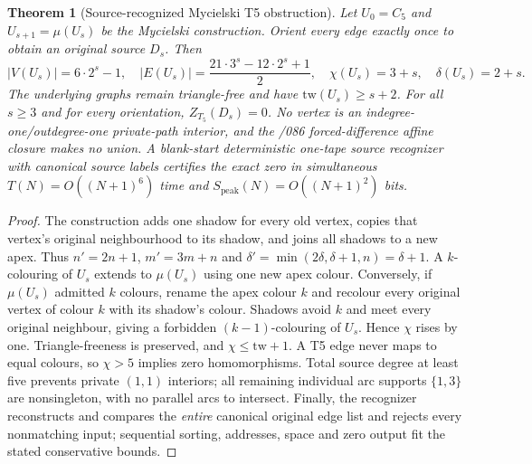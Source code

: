\documentclass[11pt]{article}
\newtheorem{theorem}{Theorem}
\begin{document}
\begin{theorem}[Source-recognized Mycielski T5 obstruction]
Let $U_0=C_5$ and $U_{s+1}=\mu(U_s)$ be the Mycielski construction.
Orient every edge exactly once to obtain an original source $D_s$.
Then
\[
|V(U_s)|=6\cdot2^s-1,\quad
|E(U_s)|=\frac{21\cdot3^s-12\cdot2^s+1}{2},\quad
\chi(U_s)=3+s,\quad \delta(U_s)=2+s.
\]
The underlying graphs remain triangle-free and have
$\mathrm{tw}(U_s)\ge s+2$. For all $s\ge3$ and for
\emph{every} orientation, $Z_{T_5}(D_s)=0$.
No vertex is an indegree-one/outdegree-one private-path interior,
and the /086 forced-difference affine closure makes no union.
A blank-start deterministic one-tape source recognizer with
canonical source labels certifies the exact zero in simultaneous
$T(N)=O((N+1)^6)$ time and
$S_{\mathrm{peak}}(N)=O((N+1)^2)$ bits.
\end{theorem}
\begin{proof}
The construction adds one shadow for every old vertex, copies
that vertex's original neighbourhood to its shadow, and joins
all shadows to a new apex. Thus $n'=2n+1$, $m'=3m+n$ and
$\delta'=\min(2\delta,\delta+1,n)=\delta+1$.
A $k$-colouring of $U_s$ extends to $\mu(U_s)$ using one
new apex colour. Conversely, if $\mu(U_s)$ admitted $k$
colours, rename the apex colour $k$ and recolour every original
vertex of colour $k$ with its shadow's colour. Shadows avoid
$k$ and meet every original neighbour, giving a forbidden
$(k-1)$-colouring of $U_s$. Hence $\chi$ rises by one.
Triangle-freeness is preserved, and $\chi\le\mathrm{tw}+1$.
A T5 edge never maps to equal colours, so $\chi>5$ implies
zero homomorphisms. Total source degree at least five prevents
private $(1,1)$ interiors; all remaining individual arc
supports $\{1,3\}$ are nonsingleton, with no parallel arcs to
intersect. Finally, the recognizer reconstructs and compares
the \emph{entire} canonical original edge list and rejects every
nonmatching input; sequential sorting, addresses, space and
zero output fit the stated conservative bounds.
\end{proof}
\end{document}
